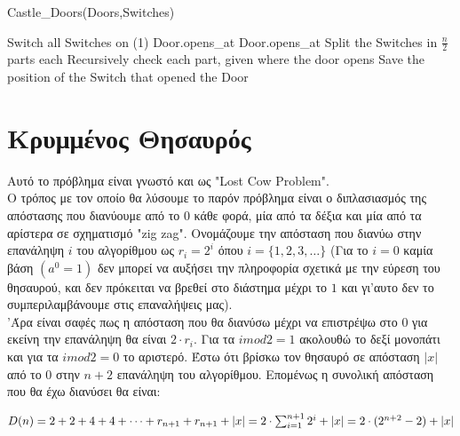 \documentclass{article} \usepackage[greek,english]{babel}
\begin{document}
    \begin{algorithm}
        \caption{Castle\_Doors(Doors,Switches)}
        \begin{algorithmic}[1]
             
            \State Switch all Switches on (1) 
                    \State Door.opens\_at 
                \Else
                    \State Door.opens\_at 
                \EndIf
                \State Split the Switches in $\frac{n}{2}$ parts each
                \State Recursively check each part, given where the door opens 
                \State Save the position of the Switch that opened the Door

            \EndFor

        \end{algorithmic}
    \end{algorithm}

\pagebreak

\section{Κρυμμένος Θησαυρός}
Αυτό το πρόβλημα είναι γνωστό και ως "Lost Cow Problem". \\ \break
Ο τρόπος με τον οποίο θα λύσουμε το παρόν πρόβλημα είναι ο διπλασιασμός της απόστασης που διανύουμε από
το $0$ κάθε φορά, μία από τα δέξια και μία από τα αρίστερα σε σχηματισμό "zig zag". 
Ονομάζουμε την απόσταση που διανύω στην επανάληψη $i$ του αλγορίθμου ως $r_{i} = 2^{i}$ όπου $i=\{1,2,3, \dots\}$
(Για το $i=0$ καμία βάση $(a^0 = 1)$ δεν μπορεί να αυξήσει την πληροφορία σχετικά με την εύρεση του θησαυρού, και δεν πρόκειται
να βρεθεί στο διάστημα μέχρι το $1$ και γι'αυτο δεν το συμπεριλαμβάνουμε στις επαναλήψεις μας). \\
'Άρα
είναι σαφές πως η απόσταση που θα διανύσω μέχρι να επιστρέψω στο $0$ για εκείνη την επανάληψη θα είναι $2\cdot r_i$.
Για τα $imod2 = 1$ ακολουθώ το δεξί μονοπάτι και για τα $imod2 = 0$ το αριστερό. Έστω ότι βρίσκω τον
θησαυρό σε απόσταση $|x|$ από το $0$ στην $n+2$ επανάληψη του αλγορίθμου. Επομένως η συνολική απόσταση
που θα έχω διανύσει θα είναι: \\ 
\begin{center}
    $D(n) = 2 + 2 + 4 + 4 + \dots + r_{n+1} + r_{n+1} + |x| =\\ \\
    2 \cdot \sum_{i=1}^{n+1}2^{i} + |x| = \\
    2 \cdot (2^{n+2}-2)+|x|$
\end{center} \\
\end{document}
